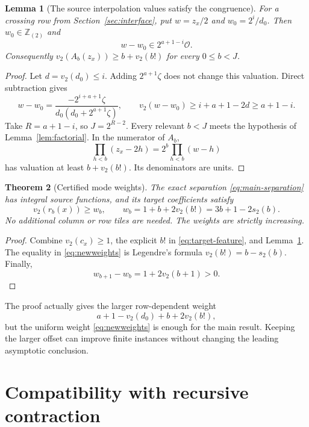 \documentclass[11pt]{article}
\newtheorem{theorem}{Theorem}[section]
\newtheorem{lemma}[theorem]{Lemma}
\theoremstyle{remark}
\newcommand{\OO}{\mathcal O}
\newcommand{\Ztwo}{\mathbb Z_{(2)}}
\begin{document}
\begin{lemma}[The source interpolation values satisfy the congruence]\label{lem:actual-domain}
For a crossing row from Section~\ref{sec:interface}, put $w=z_x/2$ and $w_0=2^i/d_0$. Then $w_0\in\Ztwo$ and
\begin{equation}\label{eq:prime-congruence}
 w-w_0\in2^{a+1-i}\OO.
\end{equation}
Consequently $v_2(A_b(z_x))\ge b+v_2(b!)$ for every $0\le b<J$.
\end{lemma}

\begin{proof}
Let $d=v_2(d_0)\le i$. Adding $2^{a+1}\zeta$ does not change this valuation. Direct subtraction gives
\[
 w-w_0=\frac{-2^{i+a+1}\zeta}{d_0(d_0+2^{a+1}\zeta)},
 \qquad v_2(w-w_0)\ge i+a+1-2d\ge a+1-i.
\]
Take $R=a+1-i$, so $J=2^{R-2}$. Every relevant $b<J$ meets the hypothesis of Lemma~\ref{lem:factorial}. In the numerator of $A_b$,
\[
 \prod_{h<b}(z_x-2h)=2^b\prod_{h<b}(w-h)
\]
has valuation at least $b+v_2(b!)$. Its denominators are units.
\end{proof}

\begin{theorem}[Certified mode weights]\label{thm:weights}
The exact separation \eqref{eq:main-separation} has integral source functions, and its target coefficients satisfy
\begin{equation}\label{eq:newweights}
 v_2(r_b(x))\ge w_b,
 \qquad w_b=1+b+2v_2(b!)=3b+1-2s_2(b).
\end{equation}
No additional column or row tiles are needed. The weights are strictly increasing.
\end{theorem}

\begin{proof}
Combine $v_2(c_x)\ge1$, the explicit $b!$ in \eqref{eq:target-feature}, and Lemma~\ref{lem:actual-domain}. The equality in \eqref{eq:newweights} is Legendre's formula $v_2(b!)=b-s_2(b)$. Finally,
\[
 w_{b+1}-w_b=1+2v_2(b+1)>0.
\]
\end{proof}

The proof actually gives the larger row-dependent weight
\[
 a+1-v_2(d_0)+b+2v_2(b!),
\]
but the uniform weight \eqref{eq:newweights} is enough for the main result. Keeping the larger offset can improve finite instances without changing the leading asymptotic conclusion.

\section{Compatibility with recursive contraction}\label{sec:recursion}
\end{document}
